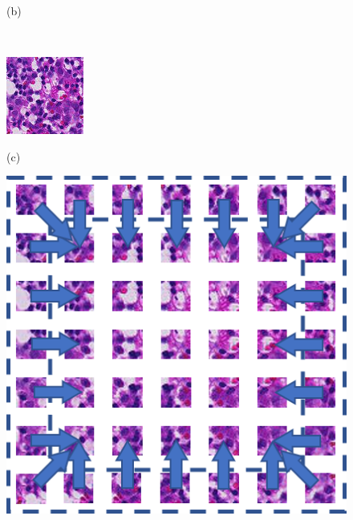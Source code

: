 \begin{figure}
\begin{minipage}[b]{0.4\linewidth}
		\centerline{(b)}\medskip
	\end{minipage}
	\\
	\begin{minipage}[b]{.4\linewidth}
		\centering
		\centerline{\includegraphics[width=\textwidth]{images/histo.png}}
		\centerline{(c)}\medskip
	\end{minipage}
	\hfill
	\begin{minipage}[b]{.4\linewidth}
		\centering
		\centerline{\includegraphics[width=\textwidth]{images/histo_grid.png}}

\end{minipage}
\end{figure}
